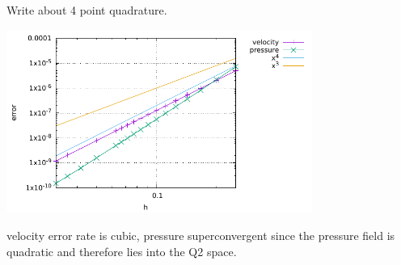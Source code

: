 {\color{red} Write about 4 point quadrature}.









\begin{center}
\includegraphics[width=10cm]{python_codes/fieldstone_19/errors}
\end{center}

velocity error rate is cubic, pressure superconvergent since the pressure field
is quadratic and therefore lies into the Q2 space.
